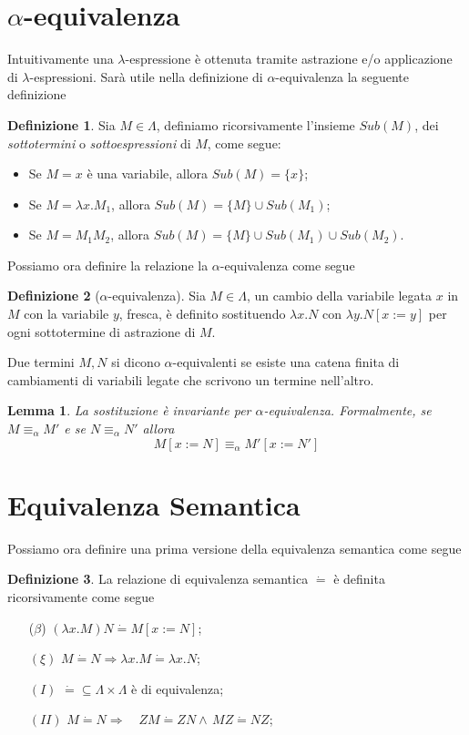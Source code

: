 \documentclass[a4paper,11pt]{article}
\newtheorem{lemma}{Lemma}
\theoremstyle{definition}
\newtheorem{defn}{Definizione}
\begin{document}
\section{$\alpha$-equivalenza}

Intuitivamente una $\lambda$-espressione è ottenuta tramite astrazione e/o
applicazione di $\lambda$-espressioni. Sarà utile nella definizione di
$\alpha$-equivalenza la seguente definizione
\begin{defn}
  Sia $M\in\Lambda$, definiamo ricorsivamente l'insieme $Sub(M)$, dei
  \textit{sottotermini} o \textit{sottoespressioni} di $M$, come segue:
  \begin{itemize}
    \item Se $M=x$ è una variabile, allora $Sub(M)=\{x\}$;
    \item Se $M=\lambda x.M_1$, allora $Sub(M)=\{M\} \cup Sub(M_1)$;
    \item Se $M=M_1M_2$, allora $Sub(M)=\{M\}\cup Sub(M_1) \cup Sub(M_2)$.
  \end{itemize}
\end{defn}


Possiamo ora definire la relazione la $\alpha$-equivalenza come segue

\begin{defn}[$\alpha$-equivalenza]
  Sia $M\in\Lambda$, un cambio della variabile legata $x$ in $M$ con la
  variabile $y$, fresca, è definito sostituendo $\lambda x.N$ con $\lambda
  y.N[x:=y]$ per ogni sottotermine di astrazione di $M$.

  Due termini $M,N$ si dicono $\alpha$-equivalenti se esiste una catena
  finita di cambiamenti di variabili legate che scrivono un termine
  nell'altro. 
\end{defn}

\begin{lemma}
  La sostituzione è invariante per $\alpha$-equivalenza. Formalmente, se
  $M\equiv_\alpha M'$ e se $N\equiv_\alpha N'$ allora
  \[
    M[x:= N] \equiv_\alpha M'[x:=N']
  \]
\end{lemma}

\section{Equivalenza Semantica}
Possiamo ora definire una prima versione della equivalenza semantica come segue
\begin{defn}
  La relazione di equivalenza semantica $\dot =$ è definita ricorsivamente
  come segue
  \begin{itemize}
    \item[($\beta$)] $(\lambda x.M)N \dot = M[x:=N]$;
    \item[$(\xi)$] $M\dot = N \Rightarrow \lambda x.M \dot = \lambda x.N$;
    \item[$(I)$] $\dot = \subseteq \Lambda\times\Lambda$ è di equivalenza;
    \item[$(II)$] $M\dot = N \Rightarrow \quad ZM\dot =ZN \wedge\, MZ\dot
      =NZ$;
  \end{itemize}
\end{defn}
\end{document}
